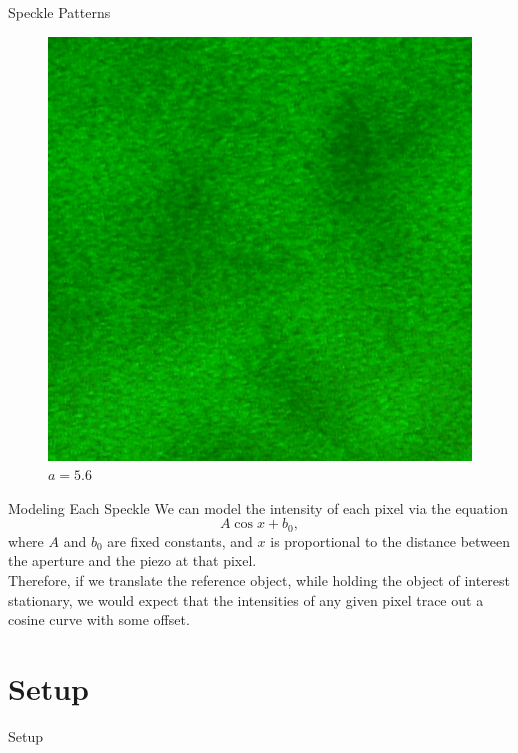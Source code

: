 \documentclass[pdf]{beamer}
\begin{document}
\begin{frame}{Speckle Patterns}
\begin{figure}[!htb]
  \caption{$a=16$}
\endminipage\hfill
{}
  \includegraphics[width=\linewidth]{apertures/5.png}
  \caption{$a=5.6$}
\endminipage
\end{figure}
\end{frame}

\begin{frame}{Modeling Each Speckle}
We can model the intensity of each pixel via the equation$$A\cos x + b_0,$$where $A$ and $b_0$ are fixed constants, and $x$ is proportional to the distance between the aperture and the piezo at that pixel.\\
\vspace{0.5cm}
Therefore, if we translate the reference object, while holding the object of interest stationary, we would expect that the intensities of any given pixel trace out a cosine curve with some offset.
\end{frame}

\section{Setup}
\begin{frame}{Setup}

\end{frame}
\end{document}
